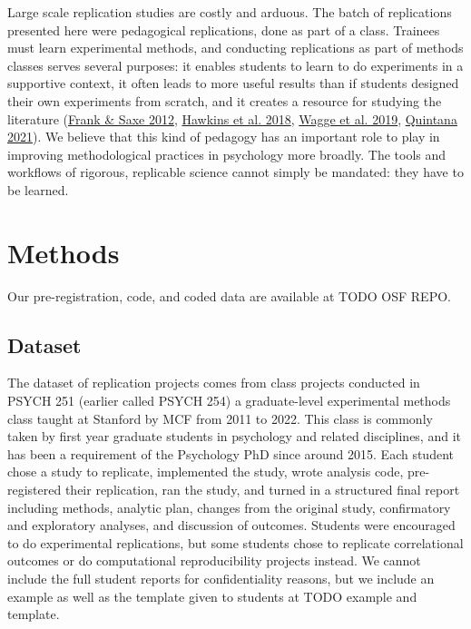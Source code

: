 \documentclass[
  english,
  a4paper,
]{article}
\begin{document}
Large scale replication studies are costly and arduous. The batch of replications presented here were pedagogical replications, done as part of a class. Trainees must learn experimental methods, and conducting replications as part of methods classes serves several purposes: it enables students to learn to do experiments in a supportive context, it often leads to more useful results than if students designed their own experiments from scratch, and it creates a resource for studying the literature (\protect\hyperlink{ref-frank2012}{Frank \& Saxe 2012}, \protect\hyperlink{ref-hawkins2018}{Hawkins et al. 2018}, \protect\hyperlink{ref-wagge2019}{Wagge et al. 2019}, \protect\hyperlink{ref-quintana2021}{Quintana 2021}). We believe that this kind of pedagogy has an important role to play in improving methodological practices in psychology more broadly. The tools and workflows of rigorous, replicable science cannot simply be mandated: they have to be learned.

\hypertarget{methods}{%
\section{Methods}\label{methods}}

Our pre-registration, code, and coded data are available at TODO OSF REPO.

\hypertarget{dataset}{%
\subsection{Dataset}\label{dataset}}

The dataset of replication projects comes from class projects conducted in PSYCH 251 (earlier called PSYCH 254) a graduate-level experimental methods class taught at Stanford by MCF from 2011 to 2022. This class is commonly taken by first year graduate students in psychology and related disciplines, and it has been a requirement of the Psychology PhD since around 2015. Each student chose a study to replicate, implemented the study, wrote analysis code, pre-registered their replication, ran the study, and turned in a structured final report including methods, analytic plan, changes from the original study, confirmatory and exploratory analyses, and discussion of outcomes. Students were encouraged to do experimental replications, but some students chose to replicate correlational outcomes or do computational reproducibility projects instead. We cannot include the full student reports for confidentiality reasons, but we include an example as well as the template given to students at TODO example and template.
\end{document}
